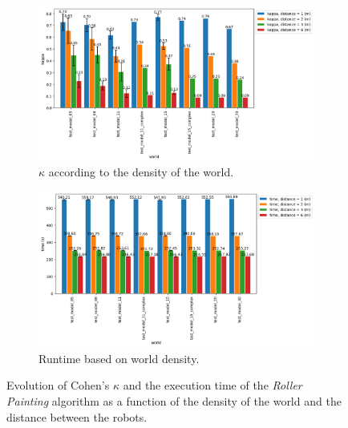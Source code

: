 \documentclass[english,RandD]{rapportPFE}  %
\begin{document}
			\begin{figure}[h!]
				\centering
				\begin{subfigure}[t]{0.9\linewidth}
					\includegraphics[width=\linewidth]{graphics/peinture_au_rouleau-kappa_vs_world_for_each_d.png}
					\caption{$\kappa$ according to the density of the world.}
					\label{fig:peinture_au_rouleau-kappa_vs_world}
				\end{subfigure}
				\hfill
				\begin{subfigure}[t]{0.9\linewidth}
						\includegraphics[width=\linewidth]{graphics/peinture_au_rouleau-time_vs_world_for_each_d.png}
						\caption{Runtime based on world density.}
						\label{fig:peinture_au_rouleau-time_vs_world}
				\end{subfigure}
				\caption{Evolution of Cohen's $\kappa$ and the execution time of the \textit{Roller Painting} algorithm as a function of the density of the world and the distance between the robots.}
				\label{fig:peinture_au_rouleau-world}
			\end{figure}
\end{document}
